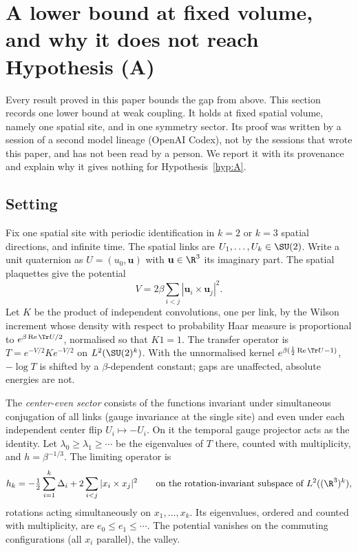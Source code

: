 
\section{A lower bound at fixed volume, and why it does not reach Hypothesis (A)}\label{sec:smallbox}

Every result proved in this paper bounds the gap from above. This section records one lower bound
at weak coupling. It holds at fixed spatial volume, namely one spatial site, and in one symmetry sector.
Its proof was written by a session of a second model lineage (OpenAI Codex), not by the sessions that
wrote this paper, and has not been read by a person. We report it with its provenance and explain why it gives nothing for
Hypothesis~\ref{hyp:A}.

\subsection{Setting}
Fix one spatial site with periodic identification in $k=2$ or $k=3$ spatial directions, and infinite
time. The spatial links are $U_1,\dots,U_k\in\SU(2)$. Write a unit quaternion as $U=(u_0,\mathbf u)$ with
$\mathbf u\in\R^3$ its imaginary part. The spatial plaquettes give the potential
\[
V=2\beta\sum_{i<j}|\mathbf u_i\times\mathbf u_j|^2 .
\]
Let $K$ be the product of independent convolutions, one per link, by the Wilson increment whose
density with respect to probability Haar measure is proportional to $e^{\beta\operatorname{Re}\Tr U/2}$,
normalised so that $K1=1$. The transfer operator is $T=e^{-V/2}Ke^{-V/2}$ on $L^2(\SU(2)^k)$. With the
unnormalised kernel $e^{\beta(\frac12\operatorname{Re}\Tr U-1)}$, $-\log T$ is shifted by a
$\beta$-dependent constant; gaps are unaffected, absolute energies are not.

The \emph{center-even sector} consists of the functions invariant under simultaneous conjugation of all
links (gauge invariance at the single site) and even under each independent center flip
$U_i\mapsto-U_i$. On it the temporal gauge projector acts as the identity. Let
$\lambda_0\ge\lambda_1\ge\cdots$ be the eigenvalues of $T$ there, counted with multiplicity, and
$h=\beta^{-1/3}$. The limiting operator is
\[
h_k=-\tfrac12\sum_{i=1}^k\Delta_i+2\sum_{i<j}|x_i\times x_j|^2
\qquad\text{on the rotation-invariant subspace of }L^2((\R^3)^k),
\]
rotations acting simultaneously on $x_1,\dots,x_k$. Its eigenvalues, ordered and counted with
multiplicity, are $e_0\le e_1\le\cdots$. The potential vanishes on the commuting configurations
(all $x_i$ parallel), the valley.

